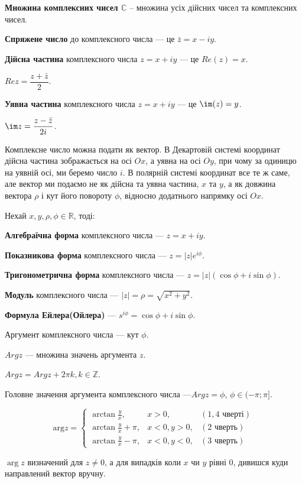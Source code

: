 \textbf{Множина комплексних чисел $\mathbb{C}$} -- множина усіх дійсних чисел та комплексних чисел.

\textbf{Спряжене число} до комплексного числа --- це $\bar z = x - iy$.

\textbf{Дійсна частина} комплексного числа $z = x + iy$ --- це $Re(z) = x$.

$Re z = \dfrac{z + \bar{z}}{2}$.

\textbf{Уявна частина} комплексного числа $z = x + iy$ --- це $\im(z) = y$.

$\im z = \dfrac{z - \bar{z}}{2i}$.

Комплексне число можна подати як вектор.
В Декартовій системі координат дійсна частина зображається на осі $Ox$, а уявна на осі $Oy$, при чому за одиницю на уявній осі, ми беремо число $i$.
В полярній системі координат все те ж саме, але вектор ми подаємо не як дійсна  та уявна частина, $x$ та $y$, а як довжина вектора $\rho$ і кут його повороту $\phi$, відносно додатнього напрямку осі $Ox$.

Нехай $x, y, \rho, \phi \in \mathbb{R}$, тоді:

\textbf{Алгебраїчна форма} комплексного числа --- $z = x + iy$.

\textbf{Показникова форма} комплексного числа --- $z = |z|e^{i \phi}$.

\textbf{Тригонометрична форма} комплексного числа --- $z = |z| (\cos \phi + i \sin \phi)$.

\textbf{Модуль} комплексного числа --- $|z| = \rho = \sqrt{x^2 + y^2}$.

\textbf{Формула Ейлера(Ойлера)} --- $s^{i \phi} = \cos \phi + i \sin \phi$.

Аргумент комплексного числа --- кут $\phi$.

$Arg z$ --- множина значень аргумента $z$.

$Arg z =  Arg z + 2 \pi k, k \in \mathbb{Z}$.

Головне значення аргумента комплексного числа ---$Arg z =  \phi$, $\phi \in ( - \pi; \pi ]$.

$$\text{arg}z = \left\{ \begin{array}{lcr}
\arctan{\frac{y}{x}},       & x>0,      & (1, 4 \text{ чверті}) \\
\arctan{\frac{y}{x}} + \pi, & x<0, y>0, & (2 \text{ чверть}) \\
\arctan{\frac{y}{x}} - \pi, & x<0, y<0, & (3 \text{ чверть})
\end{array}\right. $$

$\arg z$ визначений для $z \neq 0$, а для випадків коли $x$ чи $y$ рівні 0, дивишся куди направлений вектор вручну.

